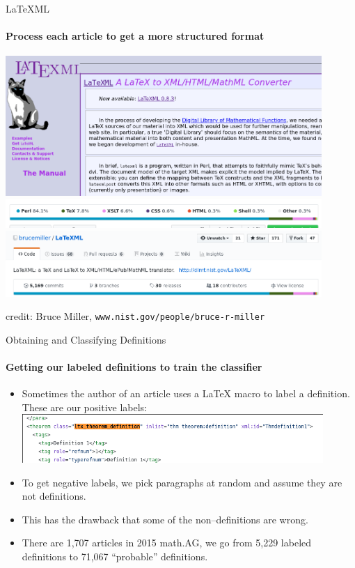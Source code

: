 \documentclass[10pt]{beamer}
\begin{document}
\begin{frame}{LaTeXML}
    \framesubtitle{Process each article to get a more structured format}
    \includegraphics[width=0.9\textwidth]{ltxml_website.png}
    \includegraphics[width=0.9\textwidth]{ltxml_github2.png}
    \includegraphics[width=0.9\textwidth]{ltxml_github1.png}
    \begin{flushright}
        {\tiny credit: Bruce Miller, \texttt{www.nist.gov/people/bruce-r-miller}}
    \end{flushright}
\end{frame}

\begin{frame}{Obtaining and Classifying Definitions}
    \framesubtitle{Getting our labeled definitions to train the classifier}
    \begin{itemize}
        \item Sometimes the author of an article uses a \LaTeX{} macro to label a definition. These are our positive labels:
    \includegraphics[width=0.9\textwidth]{ltxml_defin_xml.png}
    \item To get negative labels, we pick paragraphs at random and assume they are not definitions.
        \item This has the drawback that some of the non--definitions are wrong.
    \item There are 1,707 articles in 2015 math.AG, we go from 5,229 labeled definitions to 71,067 ``probable'' definitions.  \end{itemize}
\end{frame}
\end{document}
